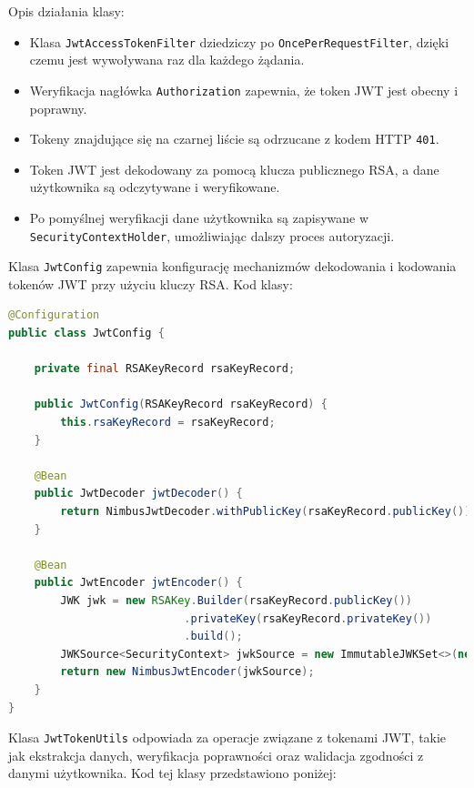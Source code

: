 Opis działania klasy:

\begin{itemize}
    \item Klasa \texttt{JwtAccessTokenFilter} dziedziczy po \texttt{OncePerRequestFilter}, dzięki czemu jest wywoływana raz dla każdego żądania.
    \item Weryfikacja nagłówka \texttt{Authorization} zapewnia, że token JWT jest obecny i poprawny.
    \item Tokeny znajdujące się na czarnej liście są odrzucane z kodem HTTP \texttt{401}.
    \item Token JWT jest dekodowany za pomocą klucza publicznego RSA, a dane użytkownika są odczytywane i weryfikowane.
    \item Po pomyślnej weryfikacji dane użytkownika są zapisywane w \texttt{SecurityContextHolder}, umożliwiając dalszy proces autoryzacji.
\end{itemize}


Klasa \texttt{JwtConfig} zapewnia konfigurację mechanizmów dekodowania i kodowania tokenów JWT przy użyciu kluczy RSA. Kod klasy:

\begin{lstlisting}[language=Java, style=JavaStyle, caption=Klasa \texttt{JwtConfig}]
@Configuration
public class JwtConfig {

    private final RSAKeyRecord rsaKeyRecord;

    public JwtConfig(RSAKeyRecord rsaKeyRecord) {
        this.rsaKeyRecord = rsaKeyRecord;
    }

    @Bean
    public JwtDecoder jwtDecoder() {
        return NimbusJwtDecoder.withPublicKey(rsaKeyRecord.publicKey()).build();
    }

    @Bean
    public JwtEncoder jwtEncoder() {
        JWK jwk = new RSAKey.Builder(rsaKeyRecord.publicKey())
                           .privateKey(rsaKeyRecord.privateKey())
                           .build();
        JWKSource<SecurityContext> jwkSource = new ImmutableJWKSet<>(new JWKSet(jwk));
        return new NimbusJwtEncoder(jwkSource);
    }
}
\end{lstlisting}

Klasa \texttt{JwtTokenUtils} odpowiada za operacje związane z tokenami JWT, takie jak ekstrakcja danych, weryfikacja poprawności oraz walidacja zgodności z danymi użytkownika. Kod tej klasy przedstawiono poniżej:

